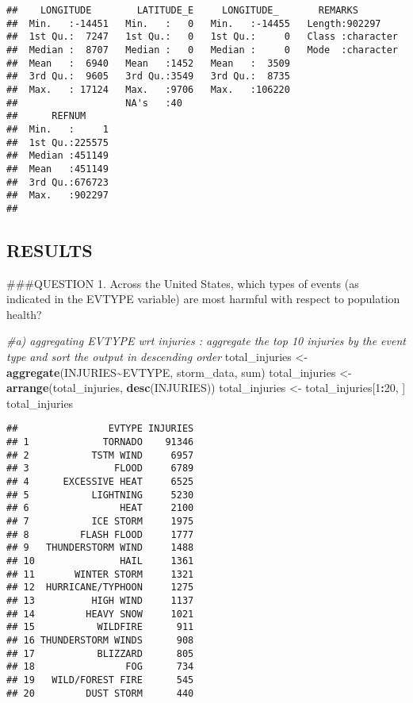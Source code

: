 \documentclass[
]{article}
\newenvironment{Shaded}{\begin{snugshade}}{\end{snugshade}}
\newcommand{\CommentTok}[1]{\textcolor[rgb]{0.56,0.35,0.01}{\textit{#1}}}
\newcommand{\DecValTok}[1]{\textcolor[rgb]{0.00,0.00,0.81}{#1}}
\newcommand{\FunctionTok}[1]{\textcolor[rgb]{0.13,0.29,0.53}{\textbf{#1}}}
\newcommand{\NormalTok}[1]{#1}
\newcommand{\OtherTok}[1]{\textcolor[rgb]{0.56,0.35,0.01}{#1}}
\newcommand{\SpecialCharTok}[1]{\textcolor[rgb]{0.81,0.36,0.00}{\textbf{#1}}}
\begin{document}
\begin{verbatim}
##    LONGITUDE        LATITUDE_E     LONGITUDE_       REMARKS         
##  Min.   :-14451   Min.   :   0   Min.   :-14455   Length:902297     
##  1st Qu.:  7247   1st Qu.:   0   1st Qu.:     0   Class :character  
##  Median :  8707   Median :   0   Median :     0   Mode  :character  
##  Mean   :  6940   Mean   :1452   Mean   :  3509                     
##  3rd Qu.:  9605   3rd Qu.:3549   3rd Qu.:  8735                     
##  Max.   : 17124   Max.   :9706   Max.   :106220                     
##                   NA's   :40                                        
##      REFNUM      
##  Min.   :     1  
##  1st Qu.:225575  
##  Median :451149  
##  Mean   :451149  
##  3rd Qu.:676723  
##  Max.   :902297  
## 
\end{verbatim}

\hypertarget{results}{%
\subsection{RESULTS}\label{results}}

\#\#\#QUESTION 1. Across the United States, which types of events (as
indicated in the EVTYPE variable) are most harmful with respect to
population health?

\begin{Shaded}
\begin{Highlighting}[]
\CommentTok{\#a) aggregating EVTYPE wrt injuries : aggregate the top 10 injuries by the event type and sort the output in descending order}
\NormalTok{total\_injuries }\OtherTok{\textless{}{-}} \FunctionTok{aggregate}\NormalTok{(INJURIES}\SpecialCharTok{\textasciitilde{}}\NormalTok{EVTYPE, storm\_data, sum)}
\NormalTok{total\_injuries }\OtherTok{\textless{}{-}} \FunctionTok{arrange}\NormalTok{(total\_injuries, }\FunctionTok{desc}\NormalTok{(INJURIES))}
\NormalTok{total\_injuries }\OtherTok{\textless{}{-}}\NormalTok{ total\_injuries[}\DecValTok{1}\SpecialCharTok{:}\DecValTok{20}\NormalTok{, ]}
\NormalTok{total\_injuries}
\end{Highlighting}
\end{Shaded}

\begin{verbatim}
##                EVTYPE INJURIES
## 1             TORNADO    91346
## 2           TSTM WIND     6957
## 3               FLOOD     6789
## 4      EXCESSIVE HEAT     6525
## 5           LIGHTNING     5230
## 6                HEAT     2100
## 7           ICE STORM     1975
## 8         FLASH FLOOD     1777
## 9   THUNDERSTORM WIND     1488
## 10               HAIL     1361
## 11       WINTER STORM     1321
## 12  HURRICANE/TYPHOON     1275
## 13          HIGH WIND     1137
## 14         HEAVY SNOW     1021
## 15           WILDFIRE      911
## 16 THUNDERSTORM WINDS      908
## 17           BLIZZARD      805
## 18                FOG      734
## 19   WILD/FOREST FIRE      545
## 20         DUST STORM      440
\end{verbatim}
\end{document}

